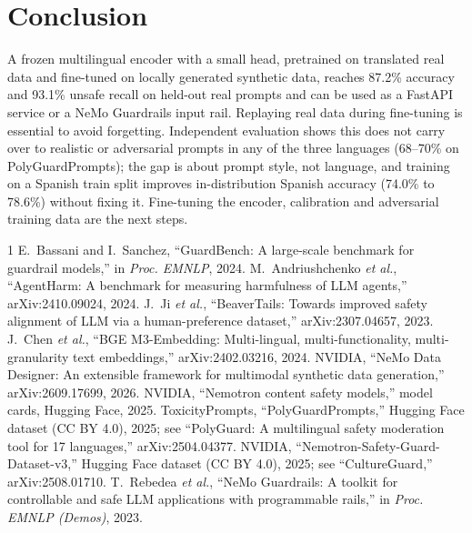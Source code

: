 \documentclass[conference]{IEEEtran}
\begin{document}
\section{Conclusion}
A frozen multilingual encoder with a small head, pretrained on translated real data and fine-tuned on locally generated synthetic data, reaches 87.2\% accuracy and 93.1\% unsafe recall on held-out real prompts and can be used as a FastAPI service or a NeMo Guardrails input rail. Replaying real data during fine-tuning is essential to avoid forgetting. Independent evaluation shows this does not carry over to realistic or adversarial prompts in any of the three languages (68--70\% on PolyGuardPrompts); the gap is about prompt style, not language, and training on a Spanish train split improves in-distribution Spanish accuracy (74.0\% to 78.6\%) without fixing it. Fine-tuning the encoder, calibration and adversarial training data are the next steps.

\begin{thebibliography}{1}
 E.~Bassani and I.~Sanchez, ``GuardBench: A large-scale benchmark for guardrail models,'' in \emph{Proc. EMNLP}, 2024.
 M.~Andriushchenko \emph{et al.}, ``AgentHarm: A benchmark for measuring harmfulness of LLM agents,'' arXiv:2410.09024, 2024.
 J.~Ji \emph{et al.}, ``BeaverTails: Towards improved safety alignment of LLM via a human-preference dataset,'' arXiv:2307.04657, 2023.
 J.~Chen \emph{et al.}, ``BGE M3-Embedding: Multi-lingual, multi-functionality, multi-granularity text embeddings,'' arXiv:2402.03216, 2024.
 NVIDIA, ``NeMo Data Designer: An extensible framework for multimodal synthetic data generation,'' arXiv:2609.17699, 2026.
 NVIDIA, ``Nemotron content safety models,'' model cards, Hugging Face, 2025.
 ToxicityPrompts, ``PolyGuardPrompts,'' Hugging Face dataset (CC BY 4.0), 2025; see ``PolyGuard: A multilingual safety moderation tool for 17 languages,'' arXiv:2504.04377.
 NVIDIA, ``Nemotron-Safety-Guard-Dataset-v3,'' Hugging Face dataset (CC BY 4.0), 2025; see ``CultureGuard,'' arXiv:2508.01710.
 T.~Rebedea \emph{et al.}, ``NeMo Guardrails: A toolkit for controllable and safe LLM applications with programmable rails,'' in \emph{Proc. EMNLP (Demos)}, 2023.
\end{thebibliography}
\end{document}
